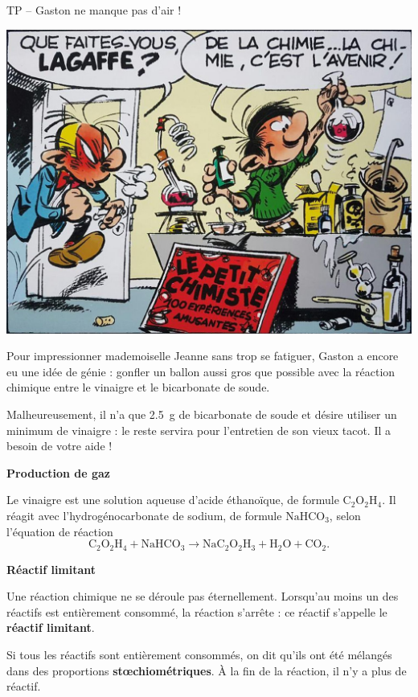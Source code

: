 \documentclass[12pt,a4paper,fleqn]{article}
\begin{document}
\normalem

\begin{header}
TP -- Gaston ne manque pas d'air !
\end{header}

\begin{multicols}{2}
\begin{center}
\includegraphics[width=\linewidth]{images/lagaffe.png}
\end{center}

\hfill

Pour impressionner mademoiselle Jeanne sans trop se fatiguer, Gaston a encore eu une idée de génie : gonfler un ballon aussi gros que possible avec la réaction chimique entre le vinaigre et le bicarbonate de soude.

Malheureusement, il n'a que \qty{2,5}{\gram} de bicarbonate de soude et désire utiliser un minimum de vinaigre : le reste servira pour l'entretien de son vieux tacot.
Il a besoin de votre aide !
\end{multicols}

\begin{doc}
\label{doc:co2}
\textbf{Production de gaz}

Le vinaigre est une solution aqueuse d'acide éthanoïque, de formule $\mathrm{C_2O_2H_4}$.
Il réagit avec l'hydrogénocarbonate de sodium, de formule $\mathrm{NaHCO_3}$, selon l'équation de réaction
\[
\mathrm{C_2O_2H_4 + NaHCO_3 \rightarrow NaC_2O_2H_3 + H_2O + CO_2.}
\]
\end{doc}

\begin{doc}
\textbf{Réactif limitant}

Une réaction chimique ne se déroule pas éternellement.
Lorsqu'au moins un des réactifs est entièrement consommé, la réaction s'arrête : ce réactif s'appelle le \textbf{réactif limitant}.

Si tous les réactifs sont entièrement consommés, on dit qu'ils ont été mélangés dans des proportions \textbf{stœchiométriques}.
À la fin de la réaction, il n'y a plus de réactif. 
\end{doc}
\end{document}
